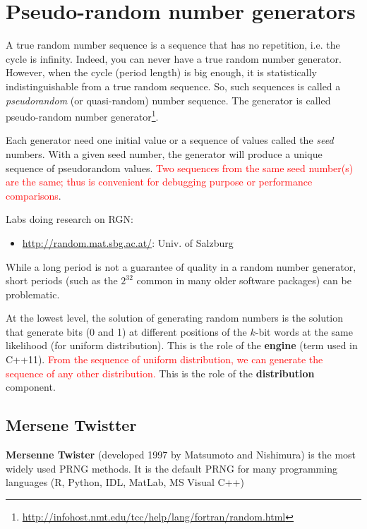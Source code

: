 \chapter{Pseudo-random number generators}


A true random number sequence is a sequence that has no repetition,
i.e. the cycle is infinity. Indeed, you can never have a true random
number generator. However, when the cycle (period length) is big
enough, it is statistically indistinguishable from a true random
sequence. So, such sequences is called a {\it pseudorandom} (or
quasi-random) number sequence. The generator is called pseudo-random
number
generator\footnote{\url{http://infohost.nmt.edu/tcc/help/lang/fortran/random.html}}.

Each generator need one initial value or a sequence of values called
the {\it seed} numbers. With a given seed number, the generator will
produce a unique sequence of pseudorandom values.
\textcolor{red}{Two sequences from the same seed number(s) are the
  same; thus is convenient for debugging purpose or performance
  comparisons}.

Labs doing research on RGN:
\begin{itemize}
\item \url{http://random.mat.sbg.ac.at/}: Univ. of Salzburg
\end{itemize}

While a long period is not a guarantee of quality in a random number generator,
short periods (such as the $2^{32}$ common in many older software packages) can be
problematic. 

At the lowest level, the solution of generating random numbers is the solution
that generate bits (0 and 1) at different positions of the $k$-bit words at the
same likelihood (for uniform distribution). This is the role of the {\bf engine} (term used in C++11).
\textcolor{red}{From the sequence of uniform distribution, we can generate the sequence of any other distribution.}
This is the role of the {\bf distribution} component.



\section{Mersene Twistter}
\label{sec:PRNG_Mersenne-Tiwstter}

{\bf Mersenne Twister} (developed 1997 by Matsumoto and Nishimura) is the most widely used PRNG methods.
It is the default PRNG for many programming languages (R, Python, IDL, MatLab, MS Visual C++)

